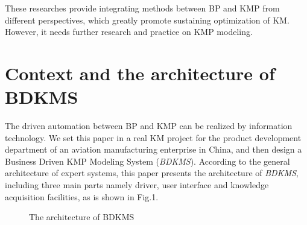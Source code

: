 \documentclass{elsarticle}
\begin{document}
\textrm{These researches provide integrating methods between BP and KMP
from different perspectives, which greatly promote sustaining
optimization of KM. However, it needs further research and practice on
KMP modeling.}
\section{ Context and the architecture of
BDKMS}
\label{sec:cont-arch-bdkms-1}
\textrm{The driven automation between BP and KMP can be realized by
information technology. We set this paper in a real KM project for the
product development department of an aviation manufacturing enterprise
in China, and then design a Business Driven KMP Modeling System
(}\textrm{\textit{BDKMS}}\textrm{). According to the general
architecture of expert systems\cite{dhaliwal1996use,
chau2002expert}, this paper presents the architecture of
}\textrm{\textit{BDKMS}}\textrm{, including three main parts namely
driver, user interface and knowledge acquisition facilities, as is
shown in Fig.1.}


  \begin{figure}[ht]
    \centering
    \scalebox{0.75}{\texttt{[image: 01]}}
    \caption{ The architecture of BDKMS}
  \end{figure}
\end{document}
